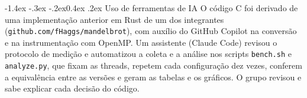\documentclass[10pt,a4paper]{article}
\makeatletter
\renewcommand\section{\@startsection{section}{1}{\z@}%
  {-1.4ex \@plus -.3ex \@minus -.2ex}{0.4ex \@plus .2ex}%
  {\normalfont\normalsize\bfseries}}
\makeatother
\begin{document}
\section{Uso de ferramentas de IA}
O código C foi derivado de uma implementação anterior em Rust de um dos integrantes (\texttt{github.com/fHaggs/mandelbrot}), com auxílio do GitHub Copilot na conversão e na instrumentação com OpenMP. Um assistente (Claude Code) revisou o protocolo de medição e automatizou a coleta e a análise nos scripts \texttt{bench.sh} e \texttt{analyze.py}, que fixam as threads, repetem cada configuração dez vezes, conferem a equivalência entre as versões e geram as tabelas e os gráficos. O grupo revisou e sabe explicar cada decisão do código.
\end{document}
